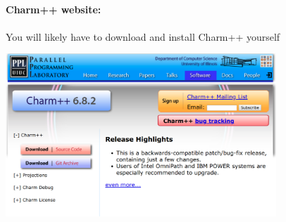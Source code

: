 \NEWSEC

\subsection{\ssInstallCharm}


\begin{frame}[fragile,label=ss-install-charm] 
\secframetitle{\ssInstallCharm}
\framesubtitle{Charm++ website: }
You will likely have to download and install Charm++ yourself
\begin{center}
\includegraphics[width=4.00in]{charm-download.png}
\end{center}
\end{frame}






